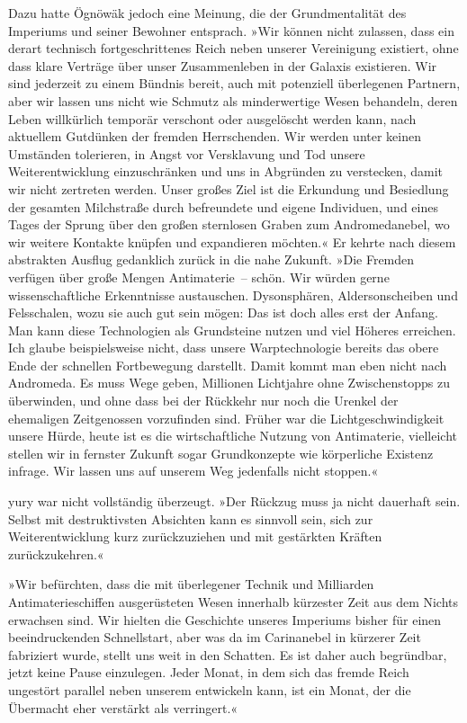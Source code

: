 Dazu hatte Ögnöwäk jedoch eine Meinung, die der Grundmentalität des Imperiums und seiner Bewohner entsprach. »Wir können nicht zulassen, dass ein derart technisch fortgeschrittenes Reich neben unserer Vereinigung existiert, ohne dass klare Verträge über unser Zusammenleben in der Galaxis existieren. Wir sind jederzeit zu einem Bündnis bereit, auch mit potenziell überlegenen Partnern, aber wir lassen uns nicht wie Schmutz als minderwertige Wesen behandeln, deren Leben willkürlich temporär verschont oder ausgelöscht werden kann, nach aktuellem Gutdünken der fremden Herrschenden. Wir werden unter keinen Umständen tolerieren, in Angst vor Versklavung und Tod unsere Weiterentwicklung einzuschränken und uns in Abgründen zu verstecken, damit wir nicht zertreten werden. Unser großes Ziel ist die Erkundung und Besiedlung der gesamten Milchstraße durch befreundete und eigene Individuen, und eines Tages der Sprung über den großen sternlosen Graben zum Andromedanebel, wo wir weitere Kontakte knüpfen und expandieren möchten.« Er kehrte nach diesem abstrakten Ausflug gedanklich zurück in die nahe Zukunft. »Die Fremden verfügen über große Mengen Antimaterie~– schön. Wir würden gerne wissenschaftliche Erkenntnisse austauschen. Dysonsphären, Aldersonscheiben und Felsschalen, wozu sie auch gut sein mögen: Das ist doch alles erst der Anfang. Man kann diese Technologien als Grundsteine nutzen und viel Höheres erreichen. Ich glaube beispielsweise nicht, dass unsere Warptechnologie bereits das obere Ende der schnellen Fortbewegung darstellt. Damit kommt man eben nicht nach Andromeda. Es muss Wege geben, Millionen Lichtjahre ohne Zwischenstopps zu überwinden, und ohne dass bei der Rückkehr nur noch die Urenkel der ehemaligen Zeitgenossen vorzufinden sind. Früher war die Lichtgeschwindigkeit unsere Hürde, heute ist es die wirtschaftliche Nutzung von Antimaterie, vielleicht stellen wir in fernster Zukunft sogar Grundkonzepte wie körperliche Existenz infrage. Wir lassen uns auf unserem Weg jedenfalls nicht stoppen.«

yury war nicht vollständig überzeugt. »Der Rückzug muss ja nicht dauerhaft sein. Selbst mit destruktivsten Absichten kann es sinnvoll sein, sich zur Weiterentwicklung kurz zurückzuziehen und mit gestärkten Kräften zurückzukehren.«

»Wir befürchten, dass die mit überlegener Technik und Milliarden Antimaterieschiffen ausgerüsteten Wesen innerhalb kürzester Zeit aus dem Nichts erwachsen sind. Wir hielten die Geschichte unseres Imperiums bisher für einen beeindruckenden Schnellstart, aber was da im Carinanebel in kürzerer Zeit fabriziert wurde, stellt uns weit in den Schatten. Es ist daher auch begründbar, jetzt keine Pause einzulegen. Jeder Monat, in dem sich das fremde Reich ungestört parallel neben unserem entwickeln kann, ist ein Monat, der die Übermacht eher verstärkt als verringert.«

